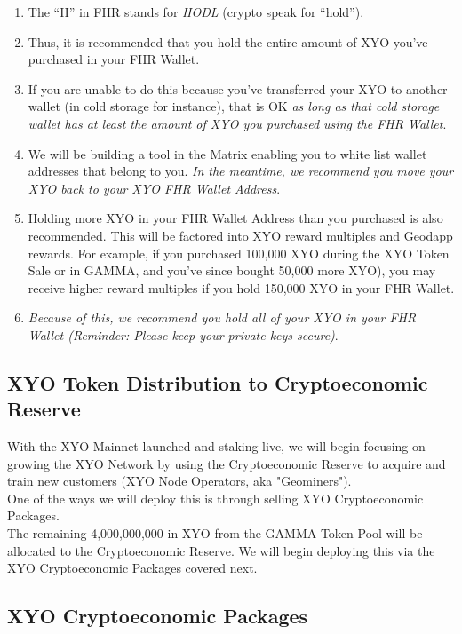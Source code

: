 \documentclass{article}
\begin{document}
\begin{enumerate}
  \item The ``H'' in FHR stands for \textit{HODL} (crypto speak for ``hold'').
  \item Thus, it is recommended that you hold the entire amount of XYO you've purchased in your FHR Wallet.
  \item If you are unable to do this because you've transferred your XYO to another wallet (in cold storage for instance), that is OK \textit{as long as that cold storage wallet has at least the amount of XYO you purchased using the FHR Wallet}.
  \item We will be building a tool in the Matrix enabling you to white list wallet addresses that belong to you. \textit{In the meantime, we recommend you move your XYO back to your XYO FHR Wallet Address}.
  \item Holding more XYO in your FHR Wallet Address than you purchased is also recommended. This will be factored into XYO reward multiples and Geodapp rewards. For example, if you purchased 100,000 XYO during the XYO Token Sale or in GAMMA, and you've since bought 50,000 more XYO), you may receive higher reward multiples if you hold 150,000 XYO in your FHR Wallet.
  \item \textit{Because of this, we recommend you hold all of your XYO in your FHR Wallet (Reminder: Please keep your private keys secure)}.
\end{enumerate}


\subsection{XYO Token Distribution to Cryptoeconomic Reserve}

With the XYO Mainnet launched and staking live, we will begin focusing on growing the XYO Network by using the Cryptoeconomic Reserve to acquire and train new customers (XYO Node Operators, aka "Geominers").\\

One of the ways we will deploy this is through selling XYO Cryptoeconomic Packages.\\

The remaining 4,000,000,000 in XYO from the GAMMA Token Pool will be allocated to the Cryptoeconomic Reserve. We will begin deploying this via the XYO Cryptoeconomic Packages covered next.

\subsection{XYO Cryptoeconomic Packages}
\end{document}
